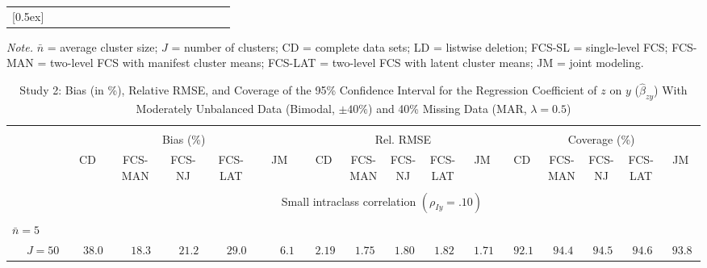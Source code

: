 \begin{sidewaystable}
\begin{threeparttable}
\begin{tabular}{llccccccccccccccc}
[0.5ex]\hline\\[-1.6ex] 
\end{tabular}
\begin{tablenotes}{\footnotesize \textit{Note.} $\bar{n}$ = average cluster size; $J$ = number of clusters; CD = complete data sets; LD = listwise deletion; FCS-SL = single-level FCS; FCS-MAN = two-level FCS with manifest cluster means; FCS-LAT = two-level FCS with latent cluster means; JM = joint modeling.}\end{tablenotes}
\end{threeparttable}
\end{sidewaystable}
\begin{sidewaystable}
\begin{threeparttable}
\setlength{\tabcolsep}{1.0pt}
\renewcommand{\arraystretch}{0.95}
\footnotesize
\caption{\small Study 2: Bias (in \%), Relative RMSE, and Coverage of the 95\% Confidence Interval for the Regression Coefficient of $z$ on $y$ ($\hat\beta_{zy}$) With Moderately Unbalanced Data (Bimodal, $\pm 40\%$) and 40\% Missing Data (MAR, $\lambda=0.5$)}
\begin{tabular}{llccccccccccccccc}
\hline\\[-1.8ex]
& & \multicolumn{5}{c}{Bias (\%)} & \multicolumn{5}{c}{Rel. RMSE} & \multicolumn{5}{c}{Coverage (\%)} \\ \cmidrule(r){3-7}\cmidrule(r){8-12}\cmidrule(r){13-17}
 &  & CD & \makecell{FCS-\\MAN} & \makecell{FCS-\\NJ} & \makecell{FCS-\\LAT} & JM & CD & \makecell{FCS-\\MAN} & \makecell{FCS-\\NJ} & \makecell{FCS-\\LAT} & JM & CD & \makecell{FCS-\\MAN} & \makecell{FCS-\\NJ} & \makecell{FCS-\\LAT} & \multicolumn{1}{c}{JM} \\ 
[0.4ex]\hline\\[-1.8ex]
& & \multicolumn{15}{c}{Small intraclass correlation $(\rho_{Iy}=.10)$} \\[0.6ex]\hline\\[-1.8ex]
\multicolumn{4}{l}{$\bar{n}=5$} \\  & \nopagebreak $\;J=50$  & $\phantom{-}38.0\phantom{0}$ & $\phantom{-}18.3\phantom{0}$ & $\phantom{-}21.2\phantom{0}$ & $\phantom{-}29.0\phantom{0}$ & $\phantom{0}\phantom{-}6.1\phantom{0}$ & $\phantom{0}2.19\phantom{0}$ & $\phantom{0}1.75\phantom{0}$ & $\phantom{0}1.80\phantom{0}$ & $\phantom{0}1.82\phantom{0}$ & $\phantom{0}1.71\phantom{0}$ & $\phantom{0}92.1\phantom{0}$ & $\phantom{0}94.4\phantom{0}$ & $\phantom{0}94.5\phantom{0}$ & $\phantom{0}94.6\phantom{0}$ & $\phantom{0}93.8\phantom{0}$ \\

\end{tabular}
\end{threeparttable}
\end{sidewaystable}
